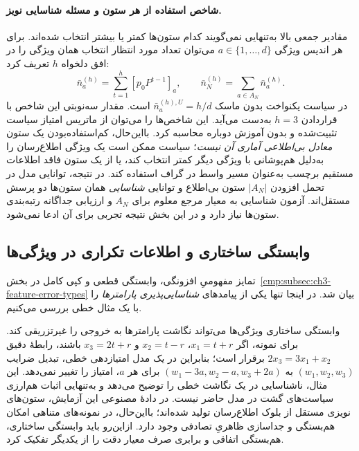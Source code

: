 \paragraph{شاخص استفاده از هر ستون و مسئله شناسایی نویز.}
مقادیر جمعی بالا به‌تنهایی نمی‌گویند
کدام ستون‌ها کمتر یا بیشتر انتخاب شده‌اند.
برای هر اندیس ویژگی $a\in\{1,\ldots,d\}$
می‌توان تعداد مورد انتظار انتخاب همان ویژگی
را در افق دلخواه $h$ تعریف کرد:
\begin{equation}\label{cmp:eq:ch3-noise-per-feature-selection}
\boxed{
\bar n_a^{(h)}
=\sum_{t=1}^{h}[p_0P^{t-1}]_a,\qquad
\bar n_N^{(h)}=\sum_{a\in A_N}\bar n_a^{(h)}.
}
\end{equation}
در سیاست یکنواخت بدون ماسک
$\bar n_a^{(h),U}=h/d$ است.
مقدار سه‌نوبتی این شاخص با قراردادن $h=3$
به‌دست می‌آید.
این شاخص‌ها را می‌توان از ماتریس امتیاز
سیاست تثبیت‌شده و بدون آموزش دوباره محاسبه کرد.
بااین‌حال، کم‌استفاده‌بودن یک ستون
\emph{معادل بی‌اطلاعی آماری آن نیست}؛
سیاست ممکن است یک ویژگی اطلاع‌رسان را
به‌دلیل هم‌پوشانی با ویژگی دیگر کمتر انتخاب کند،
یا از یک ستون فاقد اطلاعات مستقیم برچسب
به‌عنوان مسیر واسط در گراف استفاده کند.
در نتیجه، توانایی مدل در تحمل افزودن
$|A_N|$ ستون بی‌اطلاع و توانایی
\emph{شناسایی} همان ستون‌ها دو پرسش
مستقل‌اند. آزمون شناسایی به معیار مرجع
معلوم برای $A_N$ و ارزیابی جداگانه
رتبه‌بندی ستون‌ها نیاز دارد و
در این بخش نتیجه تجربی برای آن ادعا نمی‌شود.



\subsection{وابستگی ساختاری و اطلاعات تکراری در ویژگی‌ها}

تمایز مفهومیِ افزونگی، وابستگی قطعی و کپی کامل
در بخش~\ref{cmp:subsec:ch3-feature-error-types}
بیان شد. در اینجا تنها یکی از پیامدهای
\emph{شناسایی‌پذیری پارامترها} را با یک
مثال خطی بررسی می‌کنیم.

وابستگی ساختاری ویژگی‌ها
می‌تواند نگاشت پارامترها
به خروجی را غیرتزریقی کند.
برای نمونه، اگر
$x_1=t+r$،
$x_2=t-r$ و
$x_3=2t+r$ باشند،
رابطهٔ دقیق
$2x_3=3x_1+x_2$
برقرار است؛ بنابراین
در یک مدل امتیازدهی خطی،
تبدیل ضرایب
$(w_1,w_2,w_3)$
به
$(w_1-3a,w_2-a,w_3+2a)$
برای هر $a$،
امتیاز را تغییر نمی‌دهد.
این مثال، ناشناسایی در
یک نگاشت خطی را توضیح می‌دهد
و به‌تنهایی اثبات
هم‌ارزی سیاست‌های گشت
در مدل حاضر نیست.
در دادهٔ مصنوعی این آزمایش،
ستون‌های نویزی مستقل
از بلوک اطلاع‌رسان
تولید شده‌اند؛
بااین‌حال، در نمونه‌های متناهی
امکان هم‌بستگی و
جداسازی ظاهریِ تصادفی
وجود دارد.
ازاین‌رو باید
وابستگی ساختاری،
هم‌بستگی اتفاقی
و برابری صرف
معیار دقت را
از یکدیگر تفکیک کرد.



